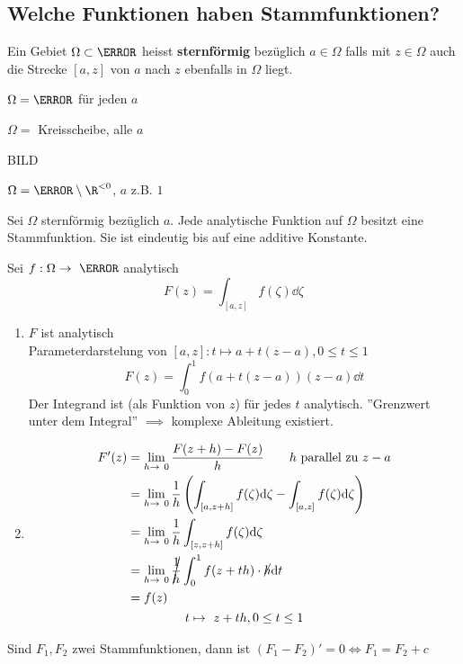 \subsection{Welche Funktionen haben Stammfunktionen?}
\begin{def*}[note = sternförmig , index = sternförmig]
	Ein Gebiet $\Omega \subset \C$ heisst \textbf{sternförmig} bezüglich $a \in \Omega$ falls mit $z \in \Omega$ auch die Strecke $[a,z]$ von $a$ nach $z$ ebenfalls in $\Omega$ liegt.
\end{def*}
\begin{bsp}
	$\Omega = \C$ für jeden $a$
\end{bsp}
\begin{bsp}
	$\Omega =$ Kreisscheibe, alle $a$
\end{bsp}
\begin{bsp}
	BILD
\end{bsp}
\begin{bsp}
	$\Omega = \C \setminus \R^{<0}$, $a$ z.B. $1$
\end{bsp}
\begin{satz*}
	Sei $\Omega$ sternförmig bezüglich $a$. Jede analytische Funktion auf $\Omega$ besitzt eine Stammfunktion. Sie ist eindeutig bis auf eine additive Konstante.
	\begin{bew}[note = Beweis und Formel]
		Sei $f: \Omega \rightarrow \C$ analytisch
		\[ F(z) = \int_{[a,z]} f(\zeta) \dd \zeta \]
		\begin{enumerate}[label = (\alph*)]
			\item $F$ ist analytisch \\
				Parameterdarstelung von $[a,z] : t \mapsto a + t(z-a) , 0 \leq t \leq 1$
				\[ F(z) = \int_0^1 f(a + t(z-a)) (z-a) \dd t \]
				Der Integrand ist (als Funktion von $z$) für jedes $t$ analytisch. ''Grenzwert unter dem Integral'' $\implies$ komplexe Ableitung existiert.
			\item \begin{gather*}
				\begin{split}
					F'(z)
						&= \lim_{h \rightarrow 0} \frac{F(z+h) - F(z)}{h} \qquad h \text{ parallel zu } z-a \\
						&= \lim_{h \rightarrow 0} \frac{1}{h} \left( \int_{[a,z+h]} f(\zeta) \dd \zeta - \int_{[a,z]} f(\zeta) \dd \zeta \right) \\
						&= \lim_{h \rightarrow 0} \frac{1}{h} \int_{[z,z+h]} f(\zeta) \dd \zeta \\
						&= \lim_{h \rightarrow 0} \cancel{\frac{1}{h}} \int_0^1 f(z + th) \cdot \cancel{h} \dd t \\
						&= f(z)
				\end{split} \\
				t \mapsto z + th , 0 \leq t \leq 1
			\end{gather*}
		\end{enumerate}
	\end{bew}
	\begin{bew}[note = Eindeutigkeit]
		Sind $F_1 , F_2$ zwei Stammfunktionen, dann ist $(F_1 - F_2)' = 0 \iff F_1 = F_2 + c$
	\end{bew}
\end{satz*}
